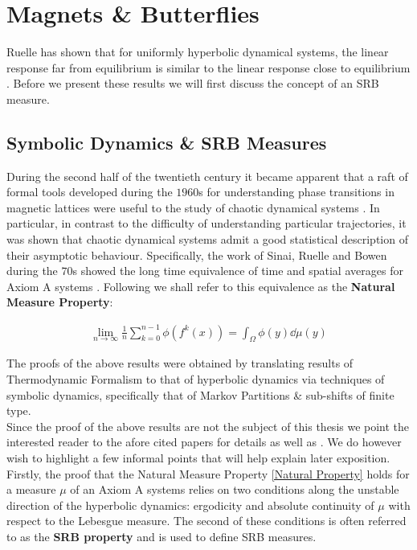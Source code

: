 \section{Magnets \& Butterflies} \label{Section: Ruelle}

Ruelle has shown that for uniformly hyperbolic dynamical systems, the linear response far from equilibrium is similar to the linear response close to equilibrium \cite{Ruelle}. Before we present these results we will first discuss the concept of an SRB measure.

\subsection{Symbolic Dynamics \& SRB Measures}

During the second half of the twentieth century it became apparent that a raft of formal tools developed during the $1960$s for understanding phase transitions in magnetic lattices were useful to the study of chaotic dynamical systems \cite{Baladi2000}. In particular, in contrast to the difficulty of understanding particular trajectories, it was shown that chaotic dynamical systems admit a good statistical description of their asymptotic behaviour. Specifically, the work of Sinai, Ruelle and Bowen during the $70$s showed the long time equivalence of time and spatial averages for Axiom A systems \cite{Bowen1970} \cite{Sinai1972} \cite{Bowen1975} \cite{Ruelle1976}. Following \cite{Eckmann1985} we shall refer to this equivalence as the \textbf{Natural Measure Property}:

\begin{align} \label{Natural Property}
\lim_{n \to \infty} \frac{1}{n}  \sum_{k=0}^{n-1} \phi(f^k(x)) = \int_{\Omega} \phi(y) \dd \mu(y) 
\end{align}

\noindent The proofs of the above results were obtained by translating results of Thermodynamic Formalism \cite{Ruelle2004} to that of hyperbolic dynamics via techniques of symbolic dynamics, specifically that of Markov Partitions \& sub-shifts of finite type. \\

\noindent Since the proof of the above results are not the subject of this thesis we point the interested reader to the afore cited papers for details as well as \cite{Walters1982}. We do however wish to highlight a few informal points that will help explain later exposition. Firstly, the proof that the Natural Measure Property \ref{Natural Property} holds for a measure $\mu$ of  an Axiom A systems relies on two conditions along the unstable direction of the hyperbolic dynamics: ergodicity and absolute continuity of $\mu$ with respect to the Lebesgue measure. The second of these conditions is often referred to as the \textbf{SRB property} and is used to define SRB measures.

